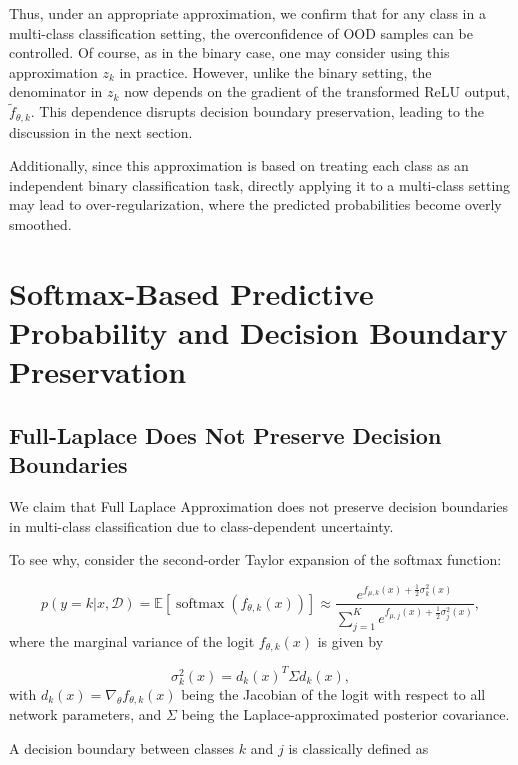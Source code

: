 \documentclass{article}
\begin{document}
Thus, under an appropriate approximation, we confirm that for any class in a multi-class classification setting, the overconfidence of OOD samples can be controlled. Of course, as in the binary case, one may consider using this approximation \(z_k\) in practice. However, unlike the binary setting, the denominator in \(z_k\) now depends on the gradient of the transformed ReLU output, \( \tilde{f}_{\theta, k} \). This dependence disrupts decision boundary preservation, leading to the discussion in the next section.

Additionally, since this approximation is based on treating each class as an independent binary classification task, directly applying it to a multi-class setting may lead to over-regularization, where the predicted probabilities become overly smoothed.


\section{Softmax-Based Predictive Probability and Decision Boundary Preservation}

\subsection{Full-Laplace Does Not Preserve Decision Boundaries}

We claim that Full Laplace Approximation does not preserve decision boundaries in multi-class classification due to class-dependent uncertainty.

To see why, consider the second-order Taylor expansion of the softmax function:

\begin{equation}
    p(y=k | x, \mathcal{D}) = \mathbb{E} \left[ \operatorname{softmax}(f_{\theta, k}(x)) \right] \approx \frac{e^{f_{\mu,k}(x) + \frac{1}{2} \sigma_k^2(x)}}{\sum_{j=1}^{K} e^{f_{\mu,j}(x) + \frac{1}{2} \sigma_j^2(x)}},
\end{equation}
where the marginal variance of the logit \( f_{\theta,k}(x) \) is given by

\begin{equation}
    \sigma_k^2(x) = d_k(x)^T \Sigma d_k(x),
\end{equation}
with \( d_k(x) = \nabla_{\theta} f_{\theta,k}(x) \) being the Jacobian of the logit with respect to all network parameters, and \( \Sigma \) being the Laplace-approximated posterior covariance.

A decision boundary between classes \( k \) and \( j \) is classically defined as
\end{document}
